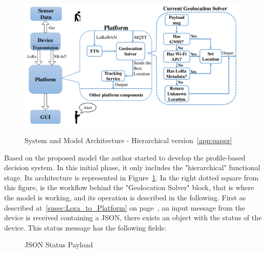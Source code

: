 \begin{figure}[htbp]
  \centering
  
    {\includegraphics[width=0.7\linewidth]{Chapters/Figures/modelarch.pdf}}%
  \caption{System and Model Architecture - Hierarchical version~\ref{app:paper}}
  \label{fig:Model_overview}
\end{figure}
Based on the proposed model the author started to
develop the profile-based decision system. In this initial phase, it only includes the "hierarchical" functional stage. Its architecture is represented in Figure~\ref{fig:Model_overview}. 
In the right dotted square from this figure, is the workflow behind the "Geolocation Solver" block, that is  where the model is working, and its operation is described in the following.
First as described at~\ref{susec:Lora_to_Platform} on page~\pageref{susec:Lora_to_Platform}, an input message from the device is received containing a JSON, there exists an object with the status of the device. This status message has the following fields:
\begin{figure}[htbp]
  \centering
  \caption{JSON Status Payload}
  \label{fig:JSON_Status}
\end{figure}

